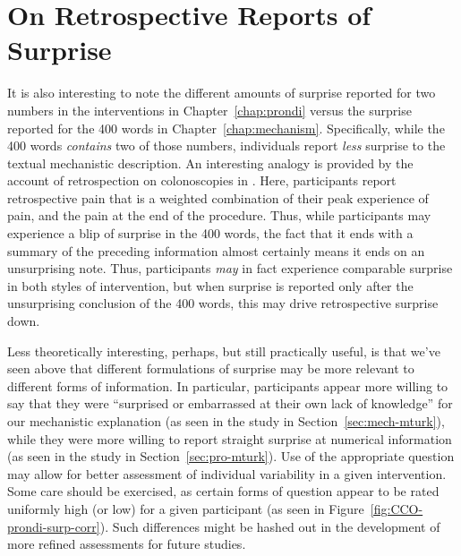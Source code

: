 
\section{On Retrospective Reports of Surprise}

It is also interesting to note the different amounts of surprise reported for
two numbers in the interventions in Chapter~\ref{chap:prondi} versus the
surprise reported for the 400 words in Chapter~\ref{chap:mechanism}.
Specifically, while the 400 words \emph{contains} two of those numbers,
individuals report \emph{less} surprise to the textual mechanistic description.
An interesting analogy is provided by the account of retrospection on
colonoscopies in \textcite{kahneman_perspective_2003}. Here, participants report
retrospective pain that is a weighted combination of their peak experience of
pain, and the pain at the end of the procedure. Thus, while participants may
experience a blip of surprise in the 400 words, the fact that it ends with a
summary of the preceding information almost certainly means it ends on an
unsurprising note.  Thus, participants \emph{may} in fact experience comparable surprise
in both styles of intervention, but when surprise is reported only after the
unsurprising conclusion of the 400 words, this may drive retrospective surprise
down.

Less theoretically interesting, perhaps, but still practically useful, is that
we've seen above that different formulations of surprise may be more relevant to
different forms of information. In particular, participants appear more willing
to say that they were “surprised or embarrassed at their own lack of knowledge”
for our mechanistic explanation (as seen in the study in
Section~\ref{sec:mech-mturk}), while they were more willing to report straight
surprise at numerical information (as seen in the study in
Section~\ref{sec:pro-mturk}). Use of the appropriate question may allow for
better assessment of individual variability in a given intervention. Some care
should be exercised, as certain forms of question appear to be rated uniformly
high (or low) for a given participant (as seen in
Figure~\ref{fig:CCO-prondi-surp-corr}). Such differences might be hashed out in
the development of more refined assessments for future studies.


